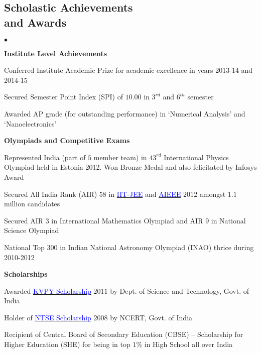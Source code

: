 \documentclass[margin,line]{res}
\newenvironment{list2}{
  \begin{list}{$\bullet$}{%
      \setlength{\itemsep}{0in}
      \setlength{\parsep}{0in} \setlength{\parskip}{0in}
      \setlength{\topsep}{0in} \setlength{\partopsep}{0in} 
      \setlength{\leftmargin}{0.2in}}}{\end{list}}
\begin{document}
\begin{resume}
\section{\sc Scholastic Achievements \\and Awards}
\begin{list2}
\item[\strut\hspace{0.5cm}\textbf{Institute Level Achievements}]
\item Conferred Institute Academic Prize for academic excellence in years 2013-14 and 2014-15
\item Secured Semester Point Index (SPI) of $10.00$ in $3^{rd}$ and $6^{th}$ semester
\item Awarded AP grade (for outstanding performance) in `Numerical Analysis' and `Nanoelectronics'\vspace{0.05in}
\item[\strut\hspace{0.5cm}\textbf{Olympiads and Competitive Exams}]
\item Represented India (part of $5$ member team) in $43^{rd}$ International Physics Olympiad held in Estonia 2012. Won Bronze Medal and also felicitated by Infosys Award
\item  Secured All India Rank (AIR) $58$ in \href{https://en.wikipedia.org/wiki/Indian_Institute_of_Technology_Joint_Entrance_Examination}{\textcolor{blue}{IIT-JEE}} and \href{https://en.wikipedia.org/wiki/All_India_Engineering/Architecture_Entrance_Examination}{\textcolor{blue}{AIEEE}} $2012$ amongst $1.1$ million candidates
\item Secured AIR $3$ in International Mathematics Olympiad and AIR $9$ in National Science Olympiad
\item National Top $300$ in Indian National Astronomy Olympiad (INAO) thrice during 2010-2012
\vspace{0.05in}
\item[\strut\hspace{0.5cm}\textbf{Scholarships}]
\item Awarded \href{http://www.kvpy.iisc.ernet.in/main/index.htm}{\textcolor{blue}{KVPY Scholarship}} $2011$ by Dept. of Science and Technology, Govt. of India
\item Holder of \href{http://www.kvpy.iisc.ernet.in/main/index.htm}{\textcolor{blue}{NTSE Scholarship}} $2008$ by NCERT, Govt. of India
\item  Recipient of Central Board of Secondary Education (CBSE) -- Scholarship for Higher Education (SHE) for being in top $1\%$ in High School all over India
\end{list2}


\end{resume}
\end{document}
